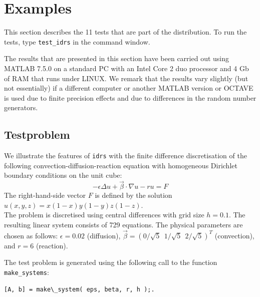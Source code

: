 \documentclass[prodmode,acmtoms]{acmsmall}
\begin{document}
\section{Examples}
This section describes the 11 tests that are part of the distribution. To run the tests, type {\tt test\_idrs} in the
command window. 

The results that are presented in this section have been carried out using MATLAB 7.5.0 
on a standard PC with an Intel Core 2 duo processor and 4 Gb of RAM that runs under LINUX. We remark that the 
results vary slightly (but not essentially) if a different computer or another MATLAB version or OCTAVE is used 
due to finite precision effects and due to differences in the random number generators.
\subsection{Testproblem}
We illustrate the features of {\tt idrs} with the finite difference discretisation of the following convection-diffusion-reaction equation with 
homogeneous Dirichlet boundary conditions on the unit cube:
\[
 -\epsilon \Delta u + \vec{\beta} \cdot \nabla u -r u =  F
\]
The right-hand-side vector $F$ is defined by the solution $u(x,y,z) = x(1-x)y(1-y)z(1-z)$. \\
The problem is discretised using central differences with grid size $h = 0.1$. 
The resulting linear system consists of 729 equations. The physical parameters are chosen as follows: 
$\epsilon = 0.02$ (diffusion), $\vec{\beta} = (0/\sqrt{5} ~~ 1/\sqrt{5} ~~ 2/\sqrt{5})^T$ (convection), and $r = 6$ 
(reaction). 

The test problem is generated using the following call to the function {\tt make\_systems}:
\begin{verbatim}
[A, b] = make\_system( eps, beta, r, h );.
\end{verbatim}
\end{document}

